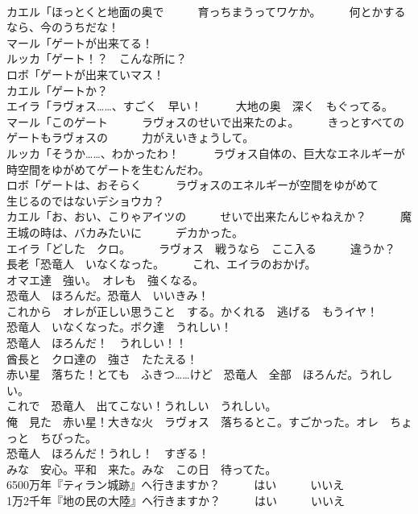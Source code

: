 \documentclass[8pt]{extreport}
\begin{document}
\begin{CJK}{UTF8}{min}
\\	カエル「ほっとくと地面の奥で　　　育っちまうってワケか。　　　何とかするなら、今のうちだな！	
\\	マール「ゲートが出来てる！	
\\	ルッカ「ゲート！？　こんな所に？	
\\	ロボ「ゲートが出来ていマス！	
\\	カエル「ゲートか？	
\\	エイラ「ラヴォス……、すごく　早い！　　　大地の奥　深く　もぐってる。	
\\	マール「このゲート　　　ラヴォスのせいで出来たのよ。　　　きっとすべてのゲートもラヴォスの　　　力がえいきょうして。	
\\	ルッカ「そうか……、わかったわ！　　　ラヴォス自体の、巨大なエネルギーが　　　時空間をゆがめてゲートを生むんだわ。	
\\	ロボ「ゲートは、おそらく　　　ラヴォスのエネルギーが空間をゆがめて　　　生じるのではないデショウカ？	
\\	カエル「お、おい、こりゃアイツの　　　せいで出来たんじゃねえか？　　　魔王城の時は、バカみたいに　　　デカかった。	
\\	エイラ「どした　クロ。　　　ラヴォス　戦うなら　ここ入る　　　違うか？	
\\	長老「恐竜人　いなくなった。　　　これ、エイラのおかげ。	
\\	オマエ達　強い。　オレも　強くなる。	
\\	恐竜人　ほろんだ。恐竜人　いいきみ！	
\\	これから　オレが正しい思うこと　する。かくれる　逃げる　もうイヤ！	
\\	恐竜人　いなくなった。ボク達　うれしい！	
\\	恐竜人　ほろんだ！　うれしい！！	
\\	酋長と　クロ達の　強さ　たたえる！	
\\	赤い星　落ちた！とても　ふきつ……けど　恐竜人　全部　ほろんだ。うれしい。	
\\	これで　恐竜人　出てこない！うれしい　うれしい。	
\\	俺　見た　赤い星！大きな火　ラヴォス　落ちるとこ。すごかった。オレ　ちょっと　ちびった。	
\\	恐竜人　ほろんだ！うれし！　すぎる！	
\\	みな　安心。平和　来た。みな　この日　待ってた。	
\\	6500万年『ティラン城跡』へ行きますか？　　　はい　　　いいえ	
\\	1万2千年『地の民の大陸』へ行きますか？　　　はい　　　いいえ	

\end{CJK}
\end{document}
